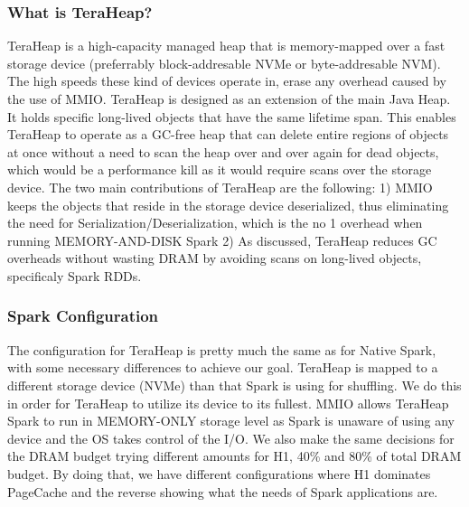 \subsubsection{What is TeraHeap?}
TeraHeap is a high-capacity managed heap that is memory-mapped over a
fast storage device (preferrably block-addresable NVMe or
byte-addresable NVM). The high speeds these kind of devices operate
in, erase any overhead caused by the use of MMIO. TeraHeap is designed
as an extension of the main Java Heap. It holds specific long-lived
objects that have the same lifetime span. This enables TeraHeap to
operate as a GC-free heap that can delete entire regions of objects at
once without a need to scan the heap over and over again for dead
objects, which would be a performance kill as it would require scans
over the storage device. The two main contributions of TeraHeap are
the following: 1) MMIO keeps the objects that reside in the storage
device deserialized, thus eliminating the need for
Serialization/Deserialization, which is the no 1 overhead when running
MEMORY-AND-DISK Spark 2) As discussed, TeraHeap reduces GC overheads
without wasting DRAM by avoiding scans on long-lived objects,
specificaly Spark RDDs.

\subsubsection{Spark Configuration}
The configuration for TeraHeap is pretty much the same as for Native
Spark, with some necessary differences to achieve our goal. TeraHeap
is mapped to a different storage device (NVMe) than that Spark is
using for shuffling. We do this in order for TeraHeap to utilize its
device to its fullest. MMIO allows TeraHeap Spark to run in
MEMORY-ONLY storage level as Spark is unaware of using any device and
the OS takes control of the I/O. We also make the same decisions for
the DRAM budget trying different amounts for H1, 40\% and 80\% of
total DRAM budget. By doing that, we have different configurations
where H1 dominates PageCache and the reverse showing what the needs of
Spark applications are. 

